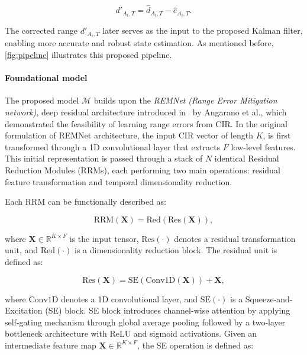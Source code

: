 \begin{equation}
    d'_{A_i,T} = \hat{d}_{A_i,T} - \hat{e}_{A_i,T}.
\end{equation}

The corrected range $d'_{A_i,T}$ later serves as the input to the proposed Kalman filter, enabling more accurate and robust state estimation. As mentioned before, \autoref{fig:pipeline} illustrates this proposed pipeline.

\paragraph{Foundational model}

The proposed model $\mathcal{M}$ builds upon the \emph{REMNet (Range Error Mitigation network)}, deep residual architecture introduced in~\cite{Simone2021UWB} by Angarano et al., which demonstrated the feasibility of learning range errors from CIR. In the original formulation of REMNet architecture, the input CIR vector of length $K$, is first transformed through a 1D convolutional layer that extracts $F$ low-level features. This initial representation is passed through a stack of $N$ identical Residual Reduction Modules (RRMs), each performing two main operations: residual feature transformation and temporal dimensionality reduction.

\newpage

Each RRM can be functionally described as:

\begin{equation}
    \text{RRM}(\mathbf{X}) = \text{Red}(\text{Res}(\mathbf{X})),
\end{equation}


where $\mathbf{X} \in \mathbb{R}^{K \times F}$ is the input tensor, $\text{Res}(\cdot)$ denotes a residual transformation unit, and $\text{Red}(\cdot)$ is a dimensionality reduction block. The residual unit is defined as:

\begin{equation}
    \text{Res}(\mathbf{X}) = \text{SE}(\text{Conv1D}(\mathbf{X})) + \mathbf{X},
\end{equation}

where $\text{Conv1D}$ denotes a 1D convolutional layer, and $\text{SE}(\cdot)$ is a Squeeze-and-Excitation (SE) block. SE block introduces channel-wise attention by applying self-gating mechanism through global average pooling followed by a two-layer bottleneck architecture with ReLU and sigmoid activations.  Given an intermediate feature map $ \mathbf{X} \in \mathbb{R}^{K \times F} $, the SE operation is defined as:


